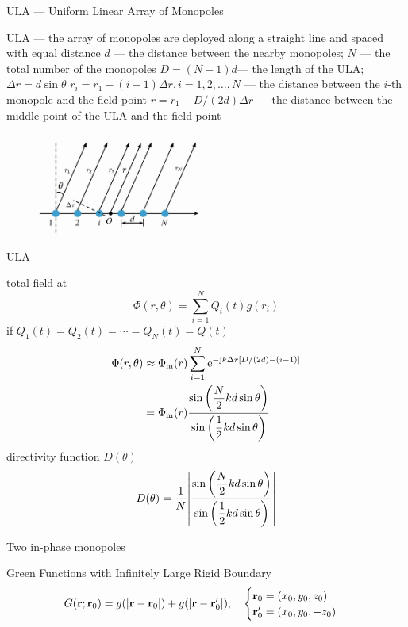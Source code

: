 \documentclass[9pt,mathserif]{beamer}
\let\emph\relax %
\begin{document}
\begin{frame}{ULA --- Uniform Linear Array of Monopoles}
	\begin{outline}
		\1 ULA --- the array of monopoles are deployed along a straight
		line and spaced with equal distance
		\1 $d$ --- the distance between the nearby monopoles;
		$N$ --- the total number of the monopoles
		\1 $D = (N-1)d$--- the length of the ULA;
		$\Delta r = d \sin \theta$
		\1 $r_i = r_1-(i-1)\Delta r, i = 1,2,\dots, N$ ---
		the distance between the $i$-th monopole and the field 
		point
		\1 $r = r_1-D/(2d)\Delta r$ --- the distance between the middle
		point of the ULA and the field point
	\end{outline}
	\begin{figure}
		\centering
		\includegraphics[width=0.5\textwidth]{img/radi/ULA.jpg}
	\end{figure}
\end{frame}

\begin{frame}{ULA}
	\begin{outline}
		\1 total field at \emph{far field}
		$$
			\Phi(r,\theta) = \sum_{i=1}^N Q_i(t) g(r_i)
		$$
		\1 if $Q_1(t) = Q_2(t) =\cdots =Q_N(t)=Q(t)$
		\begin{align*}
			\Phi(r,\theta) &\approx \Phi_\text{m}(r) 
			\sum_{i=1}^N \mathrm{e}^{-\mathrm{j} k \Delta r\qty[D/(2d) - (i-1)]}\\
			& ={\Phi_\text{m} (r)}\frac{\sin \qty(\dfrac{N}{2}kd\sin \theta
		)}{\sin \qty(\dfrac{1}{2} kd\sin \theta)}
		\end{align*}
		\1 directivity function $D(\theta)$
		$$D(\theta) = \frac{1}{N}\qty| \frac{\sin \qty(\dfrac{N}{2}kd\sin \theta
	)}{\sin \qty(\dfrac{1}{2} kd\sin \theta)}|
		$$
	\end{outline}
\end{frame}


\begin{frame}{Two in-phase monopoles}

\end{frame}

\begin{frame}{Green Functions with Infinitely Large Rigid Boundary}
	$$
		G(\vb{r};\vb{r}_0) = g(|\vb{r}-\vb{r}_0|) + g(|\vb{r}-\vb{r}'_0|), \quad 
		\begin{cases}
			\vb{r}_0 = (x_0,y_0,z_0)\\
			\vb{r}'_0 = (x_0,y_0,-z_0)
		\end{cases}
	$$
\end{frame}
\end{document}
